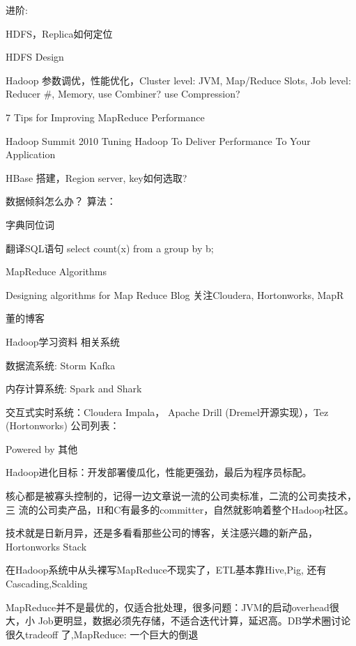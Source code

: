 进阶:
\begindot
\item HDFS，Replica如何定位
\item HDFS Design
\item Hadoop 参数调优，性能优化，Cluster level: JVM, Map/Reduce Slots, Job level: Reducer \#, Memory, use Combiner? use Compression?
\item 7 Tips for Improving MapReduce Performance
\item Hadoop Summit 2010 Tuning Hadoop To Deliver Performance To Your Application
\item HBase 搭建，Region server, key如何选取?
\item 数据倾斜怎么办？
\myenddot
算法：
\begindot
\item 字典同位词
\item 翻译SQL语句 select count(x) from a group by b;
\item MapReduce Algorithms
\item Designing algorithms for Map Reduce
\myenddot
Blog
关注Cloudera, Hortonworks, MapR
\begindot
\item 董的博客
\item Hadoop学习资料
\myenddot
相关系统
\begindot
\item 数据流系统: Storm Kafka
\item 内存计算系统: Spark and Shark
\item 交互式实时系统：Cloudera Impala， Apache Drill (Dremel开源实现），Tez (Hortonworks)
\myenddot
公司列表：
\begindot
\item Powered by
\myenddot
其他
\begindot
\item Hadoop进化目标：开发部署傻瓜化，性能更强劲，最后为程序员标配。
\item 核心都是被寡头控制的，记得一边文章说一流的公司卖标准，二流的公司卖技术，三 流的公司卖产品，H和C有最多的committer，自然就影响着整个Hadoop社区。
\item 技术就是日新月异，还是多看看那些公司的博客，关注感兴趣的新产品，Hortonworks Stack
\item 在Hadoop系统中从头裸写MapReduce不现实了，ETL基本靠Hive,Pig, 还有Cascading,Scalding
\item MapReduce并不是最优的，仅适合批处理，很多问题：JVM的启动overhead很大，小 Job更明显，数据必须先存储，不适合迭代计算，延迟高。DB学术圈讨论很久tradeoff 了,MapReduce: 一个巨大的倒退
\myenddot
